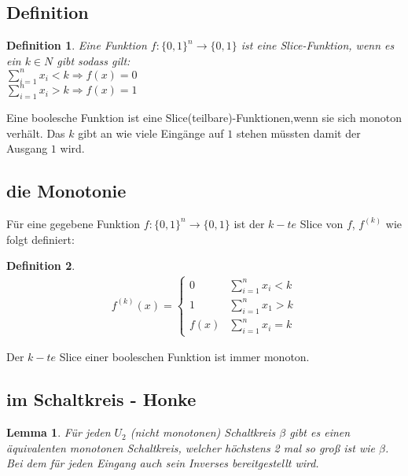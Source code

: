 \documentclass[a4paper,10pt]{article}
\newtheorem{defin}{Definition}
\newtheorem{lem}{Lemma}
\begin{document}
  \subsection{Definition}
    \begin{defin}
      Eine Funktion $f:\{0,1\}^n \rightarrow \{0,1\}$ ist eine Slice-Funktion, wenn es ein $k \in N$ gibt sodass gilt:\\
      $\sum_{i=1}^{n} x_i<k\Rightarrow f(x)=0$\\
      $\sum_{i=1}^{n} x_i>k\Rightarrow f(x)=1$\\
    \end{defin}
    Eine boolesche Funktion ist eine Slice(teilbare)-Funktionen,wenn sie sich monoton verh\"alt.
    Das $k$ gibt an wie viele Eing\"ange auf $1$ stehen m\"ussten damit der Ausgang $1$ wird.


  \subsection{die Monotonie}

    Für eine gegebene Funktion $f:\{0,1\}^n \rightarrow \{0,1\}$ ist der $k-te$ Slice von $f$, $f^{(k)}$ wie folgt definiert:\\
    \begin{defin}
      \begin{align*}
        f^{(k)}(x) =
        \begin{cases}
          0 & \sum\nolimits_{i=1}^{n} x_i < k\\
          1 & \sum\nolimits_{i=1}^{n} x_1 > k\\
          f(x) & \sum\nolimits_{i=1}^{n} x_i = k %
        \end{cases}
      \end{align*}
    \end{defin}
    Der $k-te$ Slice einer booleschen Funktion ist immer monoton.


  \subsection{im Schaltkreis - Honke}
    \begin{lem}
      Für jeden $U_2$ (nicht monotonen) Schaltkreis $\beta$ gibt es einen äquivalenten monotonen Schaltkreis, welcher höchstens
      2 mal so groß ist wie $\beta$. Bei dem f\"ur jeden Eingang auch sein Inverses bereitgestellt wird.
    \end{lem}
\end{document}
